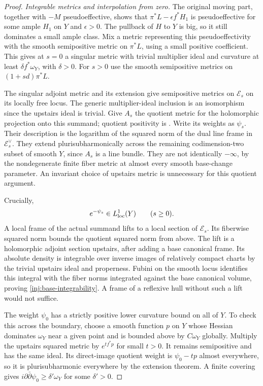\begin{proof}
\smallskip\noindent\textit{Integrable metrics and interpolation from zero.}
The original moving part, together with $-M$ pseudoeffective,
shows that $\pi^*L-\epsilon f^*H_1$ is pseudoeffective for some
ample $H_1$ on $Y$ and $\epsilon>0$.  The pullback of $H$ to
$Y$ is big, so it still dominates a small ample class.
Mix a metric representing this pseudoeffectivity with the smooth
semipositive metric on $\pi^*L$, using a small positive coefficient.
This gives at $s=0$ a singular metric with trivial multiplier ideal
and curvature at least $\delta f^*\omega_Y$, with $\delta>0$.
For $s>0$ use the smooth semipositive metrics on
$(1+sd)\pi^*L$.

The singular adjoint metric and its extension
\cite[Theorems 3.3.4--3.3.5]{PT2018} give semipositive metrics
on $\mathscr E_s$ on its locally free locus.  The generic
multiplier-ideal inclusion is an isomorphism since the upstairs
ideal is trivial.  Give $A_s$ the quotient metric for the
holomorphic projection onto this summand; quotient positivity is
\cite[Lemma 2.3.4(2)]{PT2018}.  Write its weights as $\psi_s$.
Their description is the logarithm of the squared norm of the
dual line frame in $\mathscr E_s^\vee$.  They extend
plurisubharmonically across the remaining codimension-two subset
of smooth $Y$, since $A_s$ is a line bundle.  They are not
identically $-\infty$, by the nondegenerate finite fiber metric
at almost every smooth base-change parameter.  An invariant
choice of upstairs metric is unnecessary for this quotient argument.

Crucially,
\begin{equation}\label{inj:base-integrability}
 e^{-\psi_s}\in L^1_{\rm loc}(Y)\qquad(s\ge0).
\end{equation}
A local frame of the actual summand lifts to a local section of
$\mathscr E_s$.  Its fiberwise squared norm bounds the quotient
squared norm from above.  The lift is a holomorphic adjoint section
upstairs, after adding a base canonical frame.  Its absolute
density is integrable over inverse images of relatively compact
charts by the trivial upstairs ideal and properness.  Fubini on
the smooth locus identifies this integral with the fiber norms
integrated against the base canonical volume, proving
\eqref{inj:base-integrability}.  A frame of a reflexive hull
without such a lift would not suffice.

The weight $\psi_0$ has a strictly positive lower curvature bound
on all of $Y$.  To check this across the boundary, choose a smooth
function $p$ on $Y$ whose Hessian dominates $\omega_Y$ near a
given point and is bounded above by $C\omega_Y$ globally.
Multiply the upstairs squared metric by $e^{t f^*p}$ for small
$t>0$.  It remains semipositive and has the same ideal.  Its
direct-image quotient weight is $\psi_0-tp$ almost everywhere,
so it is plurisubharmonic everywhere by the extension theorem.
A finite covering gives $i\partial\bar\partial\psi_0
\ge\delta'\omega_Y$ for some $\delta'>0$.


\end{proof}

